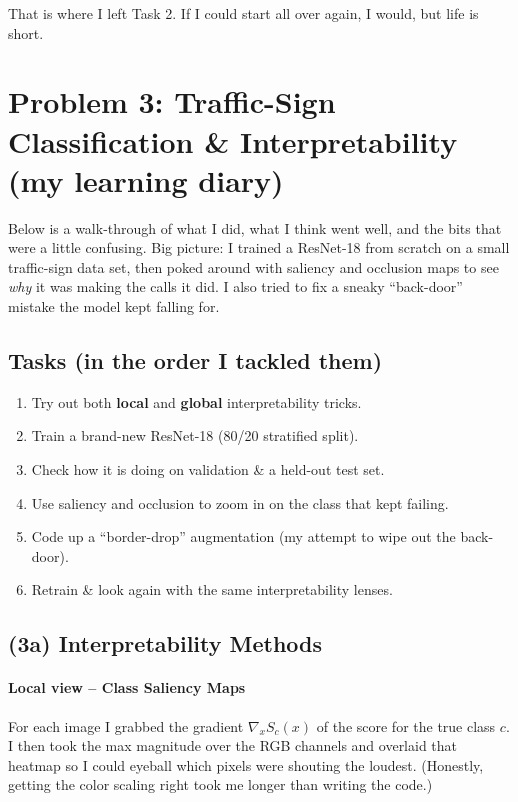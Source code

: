 \documentclass[10pt]{article}
\begin{document}
\noindent That is where I left Task 2. If I could start all over again, I would, but life is short.

\section*{Problem 3: Traffic-Sign Classification \& Interpretability (my learning diary)}

Below is a walk-through of what I did, what I think went well, and the bits that were a little confusing.  
Big picture: I trained a ResNet-18 from scratch on a small traffic-sign data set, then poked around with saliency and occlusion maps to see \emph{why} it was making the calls it did. I also tried to fix a sneaky “back-door” mistake the model kept falling for.

\subsection*{Tasks (in the order I tackled them)}
\begin{enumerate}
  \item[(3a)] Try out both \textbf{local} and \textbf{global} interpretability tricks.
  \item[(3b)] Train a brand-new ResNet-18 (80/20 stratified split).
  \item[(3c)] Check how it is doing on validation \& a held-out test set.
  \item[(3d–e)] Use saliency and occlusion to zoom in on the class that kept failing.
  \item[(3f)] Code up a “border-drop” augmentation (my attempt to wipe out the back-door).
  \item[(3g–h)] Retrain \& look again with the same interpretability lenses.
\end{enumerate}

\subsection*{(3a) Interpretability Methods}

\paragraph{Local view – Class Saliency Maps}  
For each image I grabbed the gradient $\nabla_x S_c(x)$ of the score for the true class $c$. I then took the max magnitude over the RGB channels and overlaid that heatmap so I could eyeball which pixels were shouting the loudest. (Honestly, getting the color scaling right took me longer than writing the code.)
\end{document}
